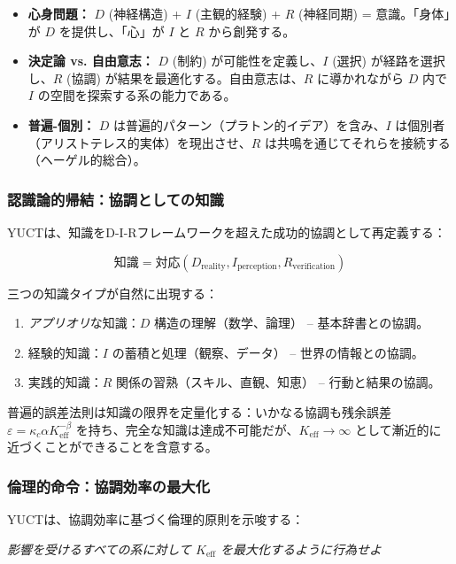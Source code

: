 \documentclass[12pt,a4paper]{article}
\newcommand{\eff}{\mathrm{eff}}
\newcommand{\Ke}{K_{\eff}}
\begin{document}
	\begin{itemize}
		\item \textbf{心身問題：} $D$ (神経構造) + $I$ (主観的経験) + $R$ (神経同期) = 意識。「身体」が $D$ を提供し、「心」が $I$ と $R$ から創発する。
		\item \textbf{決定論 vs. 自由意志：} $D$ (制約) が可能性を定義し、$I$ (選択) が経路を選択し、$R$ (協調) が結果を最適化する。自由意志は、$R$ に導かれながら $D$ 内で $I$ の空間を探索する系の能力である。
		\item \textbf{普遍-個別：} $D$ は普遍的パターン（プラトン的イデア）を含み、$I$ は個別者（アリストテレス的実体）を現出させ、$R$ は共鳴を通じてそれらを接続する（ヘーゲル的総合）。
	\end{itemize}
	
	\subsubsection{認識論的帰結：協調としての知識}
	
	YUCTは、知識をD-I-Rフレームワークを超えた成功的協調として再定義する：
	
	\[
	\text{知識} = \text{対応}(D_{\text{reality}}, I_{\text{perception}}, R_{\text{verification}})
	\]
	
	三つの知識タイプが自然に出現する：
	\begin{enumerate}
		\item \textit{アプリオリ}な知識：$D$ 構造の理解（数学、論理） – 基本辞書との協調。
		\item 経験的知識：$I$ の蓄積と処理（観察、データ） – 世界の情報との協調。
		\item 実践的知識：$R$ 関係の習熟（スキル、直観、知恵） – 行動と結果の協調。
	\end{enumerate}
	
	普遍的誤差法則は知識の限界を定量化する：いかなる協調も残余誤差 $\varepsilon = \kappa_c \alpha \Ke^{-\beta}$ を持ち、完全な知識は達成不可能だが、\(\Ke \to \infty\) として漸近的に近づくことができることを含意する。
	
	\subsubsection{倫理的命令：協調効率の最大化}
	
	YUCTは、協調効率に基づく倫理的原則を示唆する：
	
	\begin{center}
		\textit{影響を受けるすべての系に対して \(\Ke\) を最大化するように行為せよ}
	\end{center}
	
\end{document}
